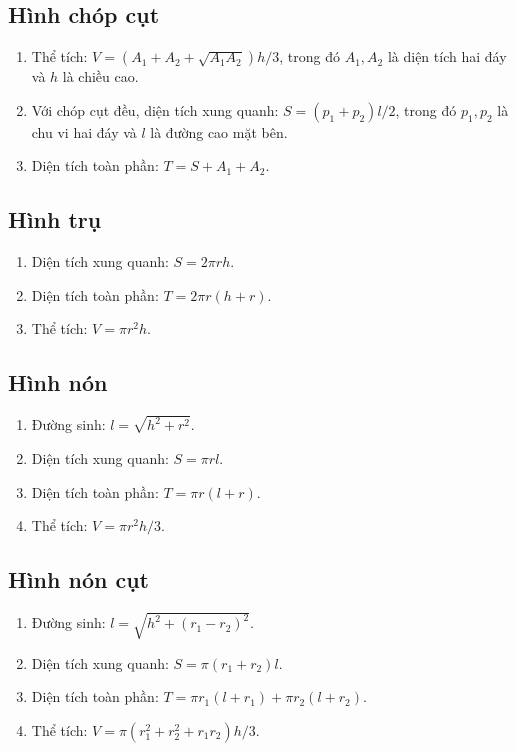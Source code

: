 \documentclass[11pt]{article}
\begin{document}
\subsection{Hình chóp cụt}
\begin{enumerate}
\item Thể tích: $V=(A_1+A_2+\sqrt{A_1A_2})h/3$, trong đó $A_1,A_2$ là diện tích hai đáy và $h$ là chiều cao.
\item Với chóp cụt đều, diện tích xung quanh: $S=(p_1+p_2)l/2$, trong đó $p_1,p_2$ là chu vi hai đáy và $l$ là đường cao mặt bên.
\item Diện tích toàn phần: $T=S+A_1+A_2$.
\end{enumerate}

\subsection{Hình trụ}
\begin{enumerate}
\item Diện tích xung quanh: $S=2\pi rh$.
\item Diện tích toàn phần: $T=2\pi r(h+r)$.
\item Thể tích: $V=\pi r^2h$.
\end{enumerate}

\subsection{Hình nón}
\begin{enumerate}
\item Đường sinh: $l=\sqrt{h^2+r^2}$.
\item Diện tích xung quanh: $S=\pi rl$.
\item Diện tích toàn phần: $T=\pi r(l+r)$.
\item Thể tích: $V=\pi r^2h/3$.
\end{enumerate}

\subsection{Hình nón cụt}
\begin{enumerate}
\item Đường sinh: $l=\sqrt{h^2+(r_1-r_2)^2}$.
\item Diện tích xung quanh: $S=\pi(r_1+r_2)l$.
\item Diện tích toàn phần: $T=\pi r_1(l+r_1)+\pi r_2(l+r_2)$.
\item Thể tích: $V=\pi(r_1^2+r_2^2+r_1r_2)h/3$.
\end{enumerate}
\end{document}
